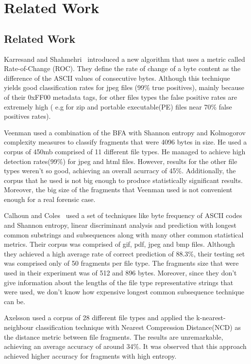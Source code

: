 \chapter{Related Work}

\section{Related Work}
Karresand and Shahmehri~\cite{roc} introduced a new algorithm that uses a metric called Rate-of-Change (ROC). They define the rate of change of a byte content as the difference of the ASCII values of consecutive bytes. Although this technique yields good classification rates for jpeg files (99\% true positives), mainly because of their 0xFF00 metadata tags, for other files types the false positive rates are extremely high ( e.g for zip and portable executable(PE) files near 70\% false positives rates).

Veenman\cite{Veenman} used a combination of the BFA\cite{MacDaniel} with Shannon entropy and Kolmogorov complexity measures to classify fragments that were 4096 bytes in size. He used a corpus of 450mb comprised of 11 different file types. He managed to achieve high detection rates(99\%) for jpeg and html files. However, results for the other file types weren't so good, achieving an overall acurracy of 45\%. Additionally, the corpus that he used is not big enough to produce statistically significant results. Moreover, the big size of the fragments that Veenman used is not convenient enough for a real forensic case.

Calhoun  and Coles~\cite{Calhoun} used a set of techniques like byte frequency of ASCII codes and Shannon entropy, linear discriminant analysis and prediction with longest common substrings and subsequences along with many other common statistical metrics. Their corpus was comprised of gif, pdf, jpeg and bmp files.
Although they achieved a high average rate of correct prediction of 88.3\%, their testing set was comprised only of 50 fragments per file type. The fragments size that were used in their experiment was of 512 and 896 bytes. Moreover, since they don't give information about the lengths of the file type representative strings  that were used, we don't know how expensive longest common subsequence technique can be. 

Axelsson\cite{Axelsson} used a corpus of 28 different file types and applied the k-nearest-neighbour classification technique with Nearest Compression Distance(NCD) as the distance metric between file fragments. The results are unremarkable, achieving an average accuracy of around 34\%. It was observed that this approach achieved higher accuracy for fragments with high entropy.

